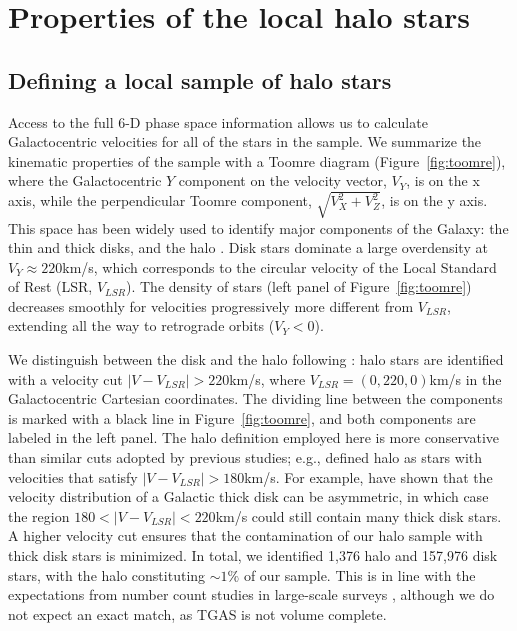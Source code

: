 \documentclass[apj, twocolappendix, numberedappendix, appendixfloats]{emulateapj}
\begin{document}
\section{Properties of the local halo stars}

\subsection{Defining a local sample of halo stars}
\label{sec:sample}
Access to the full 6-D phase space information allows us to calculate Galactocentric velocities for all of the stars in the sample.
We summarize the kinematic properties of the sample with a Toomre diagram (Figure~\ref{fig:toomre}), where the Galactocentric $Y$ component on the velocity vector, $V_Y$, is on the x axis, while the perpendicular Toomre component, $\sqrt{V_X^2+V_Z^2}$, is on the y axis. 
This space has been widely used to identify major components of the Galaxy: the thin and thick disks, and the halo \citep[e.g.,][]{venn2004}.
Disk stars dominate a large overdensity at $V_Y\approx220$\;km/s, which corresponds to the circular velocity of the Local Standard of Rest (LSR, $V_{LSR}$).
The density of stars (left panel of Figure~\ref{fig:toomre}) decreases smoothly for velocities progressively more different from $V_{LSR}$, extending all the way to retrograde orbits ($V_Y<0$).

We distinguish between the disk and the halo following \citet{ns2010}: halo stars are identified with a velocity cut $|V-V_{LSR}|>220$\;km/s, where $V_{LSR} = (0,220,0)$\;km/s in the Galactocentric Cartesian coordinates.
The dividing line between the components is marked with a black line in Figure~\ref{fig:toomre}, and both components are labeled in the left panel.
The halo definition employed here is more conservative than similar cuts adopted by previous studies; e.g., \citet{ns2010} defined halo as stars with velocities that satisfy $|V-V_{LSR}|>180$\;km/s.
For example, \citet{sb2009} have shown that the velocity distribution of a Galactic thick disk can be asymmetric, in which case the region $180<|V-V_{LSR}|<220$\;km/s could still contain many thick disk stars.
A higher velocity cut ensures that the contamination of our halo sample with thick disk stars is minimized.
In total, we identified 1,376 halo and 157,976 disk stars, with the halo constituting $\sim1\%$ of our sample.
This is in line with the expectations from number count studies in large-scale surveys \citep[e.g.,][]{juric2008}, although we do not expect an exact match, as TGAS is not volume complete.
\end{document}

